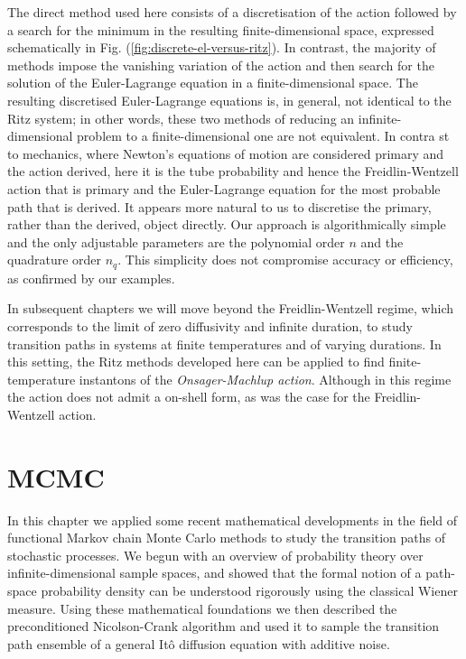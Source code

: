 \documentclass[]{cam-thesis}
\begin{document}
The direct method used here consists of a discretisation of the action
followed by a search for the minimum in the resulting finite-dimensional
space, expressed schematically in Fig. (\ref{fig:discrete-el-versus-ritz}).
In contrast, the majority of methods impose the vanishing variation
of the action and then search for the solution of the Euler-Lagrange
equation in a finite-dimensional space. The resulting discretised
Euler-Lagrange equations is, in general, not identical to the Ritz
system; in other words, these two methods of reducing an infinite-dimensional
problem to a finite-dimensional one are not equivalent. In contra st
to mechanics, where Newton's equations of motion are considered primary
and the action derived, here it is the tube probability and hence
the Freidlin-Wentzell action that is primary and the Euler-Lagrange
equation for the most probable path that is derived. It appears more
natural to us to discretise the primary, rather than the derived,
object directly. Our approach is algorithmically simple and the only
adjustable parameters are the polynomial order $n$ and the quadrature
order $n_{q}.$ This simplicity does not compromise accuracy or efficiency,
as confirmed by our examples.  

In subsequent chapters we will move beyond the Freidlin-Wentzell regime, which corresponds to the limit of zero diffusivity and infinite duration, to study transition paths in systems at finite temperatures and of varying durations. In this setting, the Ritz methods developed here can be applied to find finite-temperature instantons of the \textit{Onsager-Machlup action}. Although in this regime the action does not admit a on-shell form, as was the case for the Freidlin-Wentzell action.




\section{MCMC}

In this chapter we applied some recent mathematical developments in the field of functional Markov chain Monte Carlo methods to study the transition paths of stochastic processes. We begun with an overview of probability theory over infinite-dimensional sample spaces, and showed that the formal notion of a path-space probability density can be understood rigorously using the classical Wiener measure. Using these mathematical foundations we then described the preconditioned Nicolson-Crank algorithm and used it to sample the transition path ensemble of a general It\^{o} diffusion equation with additive noise.
\end{document}

